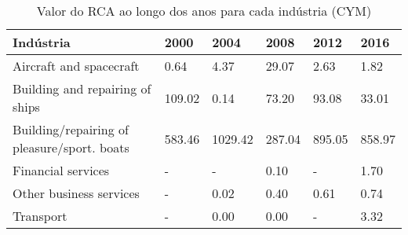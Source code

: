 \begin{table}
\centering
\caption{Valor do RCA ao longo dos anos para cada indústria (CYM)}
\label{tab:ex3-tempo-CYM}
\begin{tabular}{p{6cm}p{1.5cm}p{1.5cm}p{1.5cm}p{1.5cm}p{1.5cm}}
\toprule
                                  Indústria &   2000 &    2004 &   2008 &   2012 &   2016 \\
\midrule
                    Aircraft and spacecraft &   0.64 &    4.37 &  29.07 &   2.63 &   1.82 \\
            Building and repairing of ships & 109.02 &    0.14 &  73.20 &  93.08 &  33.01 \\
Building/repairing of pleasure/sport. boats & 583.46 & 1029.42 & 287.04 & 895.05 & 858.97 \\
                         Financial services &      - &       - &   0.10 &      - &   1.70 \\
                    Other business services &      - &    0.02 &   0.40 &   0.61 &   0.74 \\
                                  Transport &      - &    0.00 &   0.00 &      - &   3.32 \\
\bottomrule
\end{tabular}
\end{table}

